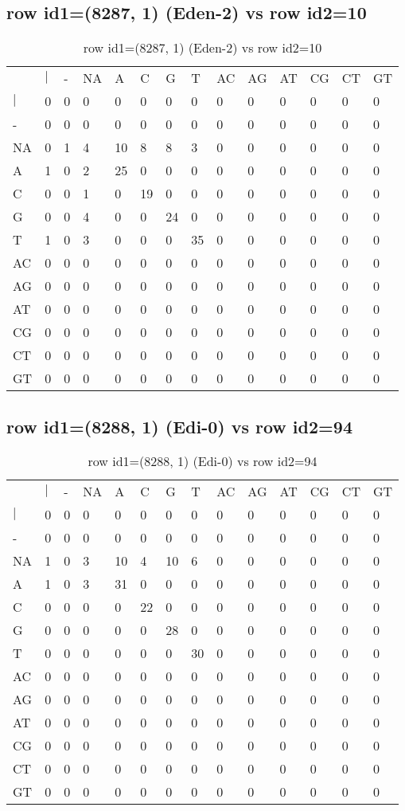\subsection{row id1=(8287, 1) (Eden-2) vs row id2=10}
\begin{center}
\begin{longtable}{|l|l|l|l|l|l|l|l|l|l|l|l|l|l|}
\caption{row id1=(8287, 1) (Eden-2) vs row id2=10} \label{table_dm452}\\
\hline
\\
\hline
&$|$&-&NA&A&C&G&T&AC&AG&AT&CG&CT&GT\\
$|$&0&0&0&0&0&0&0&0&0&0&0&0&0\\
-&0&0&0&0&0&0&0&0&0&0&0&0&0\\
NA&0&1&4&10&8&8&3&0&0&0&0&0&0\\
A&1&0&2&25&0&0&0&0&0&0&0&0&0\\
C&0&0&1&0&19&0&0&0&0&0&0&0&0\\
G&0&0&4&0&0&24&0&0&0&0&0&0&0\\
T&1&0&3&0&0&0&35&0&0&0&0&0&0\\
AC&0&0&0&0&0&0&0&0&0&0&0&0&0\\
AG&0&0&0&0&0&0&0&0&0&0&0&0&0\\
AT&0&0&0&0&0&0&0&0&0&0&0&0&0\\
CG&0&0&0&0&0&0&0&0&0&0&0&0&0\\
CT&0&0&0&0&0&0&0&0&0&0&0&0&0\\
GT&0&0&0&0&0&0&0&0&0&0&0&0&0\\
\hline
\end{longtable}
\end{center}

\subsection{row id1=(8288, 1) (Edi-0) vs row id2=94}
\begin{center}
\begin{longtable}{|l|l|l|l|l|l|l|l|l|l|l|l|l|l|}
\caption{row id1=(8288, 1) (Edi-0) vs row id2=94} \label{table_dm454}\\
\hline
\\
\hline
&$|$&-&NA&A&C&G&T&AC&AG&AT&CG&CT&GT\\
$|$&0&0&0&0&0&0&0&0&0&0&0&0&0\\
-&0&0&0&0&0&0&0&0&0&0&0&0&0\\
NA&1&0&3&10&4&10&6&0&0&0&0&0&0\\
A&1&0&3&31&0&0&0&0&0&0&0&0&0\\
C&0&0&0&0&22&0&0&0&0&0&0&0&0\\
G&0&0&0&0&0&28&0&0&0&0&0&0&0\\
T&0&0&0&0&0&0&30&0&0&0&0&0&0\\
AC&0&0&0&0&0&0&0&0&0&0&0&0&0\\
AG&0&0&0&0&0&0&0&0&0&0&0&0&0\\
AT&0&0&0&0&0&0&0&0&0&0&0&0&0\\
CG&0&0&0&0&0&0&0&0&0&0&0&0&0\\
CT&0&0&0&0&0&0&0&0&0&0&0&0&0\\
GT&0&0&0&0&0&0&0&0&0&0&0&0&0\\
\hline
\end{longtable}
\end{center}


